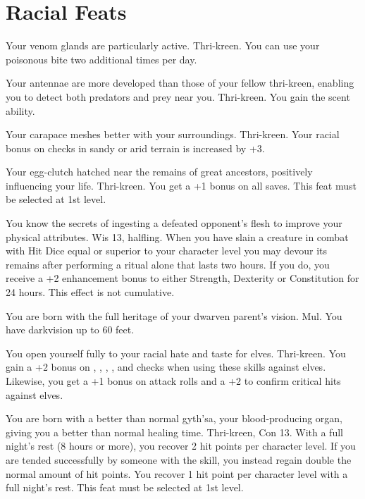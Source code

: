 \section{Racial Feats}

{Your venom glands are particularly active.}
{Thri-kreen.}
{You can use your poisonous bite two additional times per day.}
{}{}

{Your antennae are more developed than those of your fellow thri-kreen, enabling you to detect both predators and prey near you.}
{Thri-kreen.}
{You gain the scent ability.}
{}{}

{Your carapace meshes better with your surroundings.}
{Thri-kreen.}
{Your racial bonus on  checks in sandy or arid terrain is increased by +3.}
{}{}

{Your egg-clutch hatched near the remains of great ancestors, positively influencing your life.}
{Thri-kreen.}
{You get a +1 bonus on all saves.}
{}
{This feat must be selected at 1st level.}

{You know the secrets of ingesting a defeated opponent's flesh to improve your physical attributes.}
{Wis 13, halfling.}
{When you have slain a creature in combat with Hit Dice equal or superior to your character level you may devour its remains after performing a ritual alone that lasts two hours. If you do, you receive a +2 enhancement bonus to either Strength, Dexterity or Constitution for 24 hours. This effect is not cumulative.}
{}{}

{You are born with the full heritage of your dwarven parent's vision.}
{Mul.}
{You have darkvision up to 60 feet.}
{}{}

{You open yourself fully to your racial hate and taste for elves.}
{Thri-kreen.}
{You gain a +2 bonus on , , , , and  checks when using these skills against elves. Likewise, you get a +1 bonus on attack rolls and a +2 to confirm critical hits against elves.}
{}{}

{You are born with a better than normal gyth'sa, your blood-producing organ, giving you a better than normal healing time.}
{Thri-kreen, Con 13.}
{With a full night's rest (8 hours or more), you recover 2 hit points per character level. If you are tended successfully by someone with the  skill, you instead regain double the normal amount of hit points.}
{You recover 1 hit point per character level with a full night's rest.}
{This feat must be selected at 1st level.}

